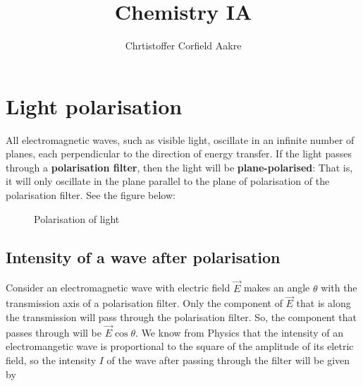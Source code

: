 \documentclass{paper}
\title{Chemistry IA}
\author{Chrtistoffer Corfield Aakre }
\begin{document}
\maketitle

\pagebreak

\section{Light polarisation}

All electromagnetic waves, such as visible light, oscillate in an infinite number of planes, each perpendicular to the direction of energy transfer. If the light passes through a \textbf{polarisation filter}, then the light will be \textbf{plane-polarised}: That is, it will only oscillate in the plane parallel to the plane of polarisation of the polarisation filter. See the figure below:

\begin{figure}[H]
\label{fig:polarisation}
\caption{Polarisation of light}
\end{figure}

\subsection{Intensity of a wave after polarisation}
Consider an electromagnetic wave with electric field $\vec{E}$ makes an angle $\theta$ with the transmission axis of a polarisation filter. Only the component of $\vec{E}$ that is along the transmission will pass through the polarisation filter. So, the component that passes through will be $\vec{E}\cos\theta$. We know from Physics that the intensity of an electromangetic wave is proportional to the square of the amplitude of its eletric field, so the intensity $I$ of the wave after passing through the filter will be given by
\end{document}
